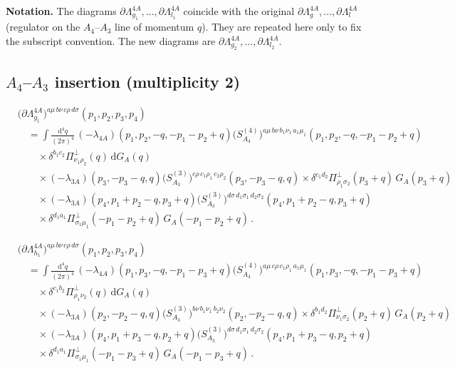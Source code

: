 \documentclass[11pt,a4paper]{article}
\begin{document}
\noindent
\textbf{Notation.}
The diagrams $\partial\Lambda^{4A}_{g_1},\ldots,\partial\Lambda^{4A}_{l_1}$
coincide with the original
$\partial\Lambda^{4A}_{g},\ldots,\partial\Lambda^{4A}_{l}$
(regulator on the $A_4$--$A_3$ line of momentum $q$).
They are repeated here only to fix the subscript convention.
The new diagrams are $\partial\Lambda^{4A}_{g_2},\ldots,\partial\Lambda^{4A}_{l_2}$.

\subsection{$A_4$--$A_3$ insertion (multiplicity 2)}

\begin{align}
&\bigl(\partial\Lambda^{4A}_{g_1}\bigr)^{a\mu\,b\nu\,c\rho\,d\sigma}(p_1,p_2,p_3,p_4)
\nonumber\\
&\quad=
\int\frac{\mathrm{d}^4q}{(2\pi)^4}\,
(-\lambda_{4A})(p_1,p_2,-q,-p_1-p_2+q)
\bigl(S^{(4)}_{A_4}\bigr)^{a\mu\,b\nu\,b_1\nu_1\,a_1\mu_1}(p_1,p_2,-q,-p_1-p_2+q)
\nonumber\\
&\qquad\times
\delta^{b_1c_2}\Pi^\perp_{\nu_1\rho_2}(q)\,\mathrm{d}G_A(q)
\nonumber\\
&\qquad\times
(-\lambda_{3A})(p_3,-p_3-q,q)
\bigl(S^{(3)}_{A_3}\bigr)^{c\rho\,c_1\rho_1\,c_2\rho_2}(p_3,-p_3-q,q)
\times
\delta^{c_1d_2}\Pi^\perp_{\rho_1\sigma_2}(p_3+q)\,G_A(p_3+q)
\nonumber\\
&\qquad\times
(-\lambda_{3A})(p_4,p_1+p_2-q,p_3+q)
\bigl(S^{(3)}_{A_3}\bigr)^{d\sigma\,d_1\sigma_1\,d_2\sigma_2}(p_4,p_1+p_2-q,p_3+q)
\nonumber\\
&\qquad\times
\delta^{d_1a_1}\Pi^\perp_{\sigma_1\mu_1}(-p_1-p_2+q)\,G_A(-p_1-p_2+q)\,.
\label{eq:dLam-g1}
\end{align}

\begin{align}
&\bigl(\partial\Lambda^{4A}_{h_1}\bigr)^{a\mu\,b\nu\,c\rho\,d\sigma}(p_1,p_2,p_3,p_4)
\nonumber\\
&\quad=
\int\frac{\mathrm{d}^4q}{(2\pi)^4}\,
(-\lambda_{4A})(p_1,p_3,-q,-p_1-p_3+q)
\bigl(S^{(4)}_{A_4}\bigr)^{a\mu\,c\rho\,c_1\rho_1\,a_1\mu_1}(p_1,p_3,-q,-p_1-p_3+q)
\nonumber\\
&\qquad\times
\delta^{c_1b_2}\Pi^\perp_{\rho_1\nu_2}(q)\,\mathrm{d}G_A(q)
\nonumber\\
&\qquad\times
(-\lambda_{3A})(p_2,-p_2-q,q)
\bigl(S^{(3)}_{A_3}\bigr)^{b\nu\,b_1\nu_1\,b_2\nu_2}(p_2,-p_2-q,q)
\times
\delta^{b_1d_2}\Pi^\perp_{\nu_1\sigma_2}(p_2+q)\,G_A(p_2+q)
\nonumber\\
&\qquad\times
(-\lambda_{3A})(p_4,p_1+p_3-q,p_2+q)
\bigl(S^{(3)}_{A_3}\bigr)^{d\sigma\,d_1\sigma_1\,d_2\sigma_2}(p_4,p_1+p_3-q,p_2+q)
\nonumber\\
&\qquad\times
\delta^{d_1a_1}\Pi^\perp_{\sigma_1\mu_1}(-p_1-p_3+q)\,G_A(-p_1-p_3+q)\,.
\label{eq:dLam-h1}
\end{align}
\end{document}
